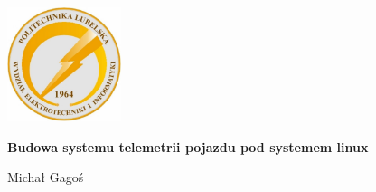 \begin{titlepage}
    \centering

    \includegraphics[width=0.25\textwidth]{logo_weii.jpg}\par
    \vspace{1cm}

    {\huge\bfseries Budowa systemu telemetrii pojazdu pod systemem linux}
    \vspace{1cm}

    {\Large Michał Gagoś \par}

\end{titlepage}